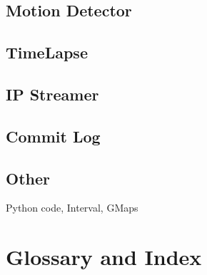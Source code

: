 \subsection{Motion Detector}
\subsection{TimeLapse}
\subsection{IP Streamer}
\subsection{Commit Log}
\subsection{Other}{Python code, Interval, GMaps}

\section{Glossary and Index}
